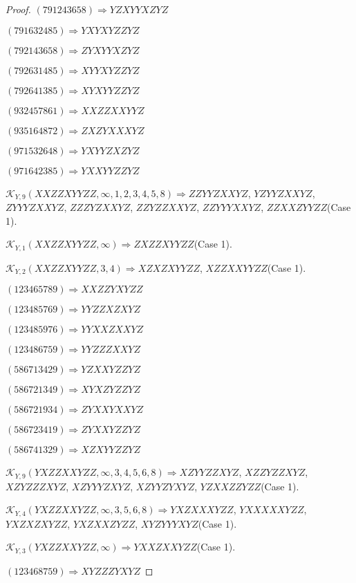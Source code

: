 \documentclass[12pt]{article}
\theoremstyle{plain}
\theoremstyle{definition}
\theoremstyle{remark}
\newcommand{\fancy}[1]{\mathcal{#1}}
\def\K{\fancy{K}}
\begin{document}
\begin{proof}
	$(7 9 1 2 4 3 6 5 8)\Rightarrow YZXYYXZYZ$
	
	$(7 9 1 6 3 2 4 8 5)\Rightarrow YXYXYZZYZ$
	
	$(7 9 2 1 4 3 6 5 8)\Rightarrow ZYXYYXZYZ$
	
	$(7 9 2 6 3 1 4 8 5)\Rightarrow XYYXYZZYZ$
	
	$(7 9 2 6 4 1 3 8 5)\Rightarrow XYXYYZZYZ$
	
	$(9 3 2 4 5 7 8 6 1)\Rightarrow XXZZXXYYZ$
	
	$(9 3 5 1 6 4 8 7 2)\Rightarrow ZXZYXXXYZ$
	
	$(9 7 1 5 3 2 6 4 8)\Rightarrow YXYYZXZYZ$
	
	$(9 7 1 6 4 2 3 8 5)\Rightarrow YXXYYZZYZ$
	
	
	
	$\K_{Y,9}(XXZZXYYZZ,\infty,1, 2, 3, 4, 5, 8)\Rightarrow $$ZZYYZXXYZ$, $YZYYZXXYZ$, $ZYYYZXXYZ$, $ZZZYZXXYZ$, $ZZYZZXXYZ$, $ZZYYYXXYZ$, $ZZXXZYYZZ$(Case 1).
	
	$\K_{Y,1}(XXZZXYYZZ,\infty)\Rightarrow $$ZXZZXYYZZ$(Case 1).
	
	$\K_{Y,2}(XXZZXYYZZ,3, 4)\Rightarrow $$XZXZXYYZZ$, $XZZXXYYZZ$(Case 1).
	
	
	
	$(1 2 3 4 6 5 7 8 9)\Rightarrow XXZZYXYZZ$
	
	$(1 2 3 4 8 5 7 6 9)\Rightarrow YYZZXZXYZ$
	
	$(1 2 3 4 8 5 9 7 6)\Rightarrow YYXXZXXYZ$
	
	$(1 2 3 4 8 6 7 5 9)\Rightarrow YYZZZXXYZ$
	
	$(5 8 6 7 1 3 4 2 9)\Rightarrow YZXXYZZYZ$
	
	$(5 8 6 7 2 1 3 4 9)\Rightarrow XYXZYZZYZ$
	
	$(5 8 6 7 2 1 9 3 4)\Rightarrow ZYXXYXXYZ$
	
	$(5 8 6 7 2 3 4 1 9)\Rightarrow ZYXXYZZYZ$
	
	$(5 8 6 7 4 1 3 2 9)\Rightarrow XZXYYZZYZ$
	
	
	
	$\K_{Y,9}(YXZZXXYZZ,\infty,3, 4, 5, 6, 8)\Rightarrow $$XZYYZZXYZ$, $XZZYZZXYZ$, $XZYZZZXYZ$, $XZYYYZXYZ$, $XZYYZYXYZ$, $YZXXZZYZZ$(Case 1).
	
	$\K_{Y,4}(YXZZXXYZZ,\infty,3, 5, 6, 8)\Rightarrow $$YXZXXXYZZ$, $YXXXXXYZZ$, $YXZXZXYZZ$, $YXZXXZYZZ$, $XYZYYYXYZ$(Case 1).
	
	$\K_{Y,3}(YXZZXXYZZ,\infty)\Rightarrow $$YXXZXXYZZ$(Case 1).
	
	
	
	$(1 2 3 4 6 8 7 5 9)\Rightarrow XYZZZYXYZ$
	

\end{proof}
\end{document}
